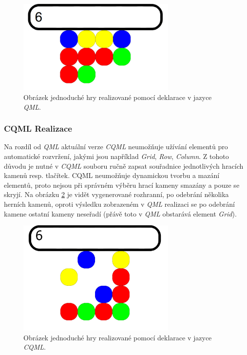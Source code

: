 \documentclass[11pt,twoside,a4paper]{book}
\begin{document}
\begin{figure}[!ht]
\begin{center}
  \includegraphics[width=0.7\textwidth]{qmlGame}
\caption{{\label{fig:outGameQML}}Obrázek jednoduché hry realizované pomocí deklarace v jazyce \textit{QML}.}
\end{center}
\end{figure}

\subsubsection{CQML Realizace}
Na rozdíl od \textit{QML} aktuální verze \textit{CQML} neumožňuje užívání elementů pro automatické rozvržení, jakými jsou například \textit{Grid}, \textit{Row}, \textit{Column}. Z tohoto důvodu je nutné v \textit{CQML} souboru ručně zapsat souřadnice jednotlivých hracích kamenů resp. tlačítek.
CQML neumožňuje dynamickou tvorbu a mazání elementů, proto nejsou při správném výběru hrací kameny smazány a pouze se skryjí.
Na obrázku \ref{fig:outGameCQML} je vidět vygenerované rozhranní, po odebrání několika herních kamenů, oproti výsledku zobrazeném v \textit{QML} realizaci se po odebrání kamene ostatní kameny neseřadí (přávě toto v \textit{QML} obstarává element \textit{Grid}).
\begin{figure}[!ht]
\begin{center}
  \includegraphics[width=0.7\textwidth]{cqmlGame}
\caption{{\label{fig:outGameCQML}}Obrázek jednoduché hry realizované pomocí deklarace v jazyce \textit{CQML}.}
\end{center}
\end{figure}
\end{document}
